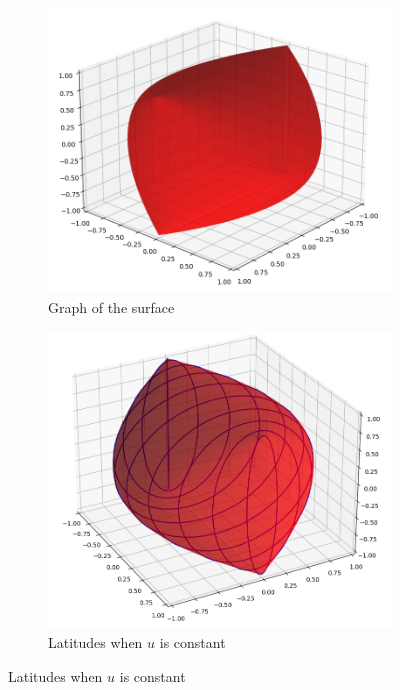 	\begin{figure}[h]
	\centering
	\begin{subfigure}[b]{0.45\textwidth}
		\centering
		\includegraphics[scale=0.35]{picture1.png}
		\caption{Graph of the surface}
	\end{subfigure}
	\begin{subfigure}[b]{0.45\textwidth}
		\centering
		\includegraphics[scale=0.3]{picture2.png}
		\caption{Latitudes when $u$ is constant}
	\end{subfigure}

\end{figure}
